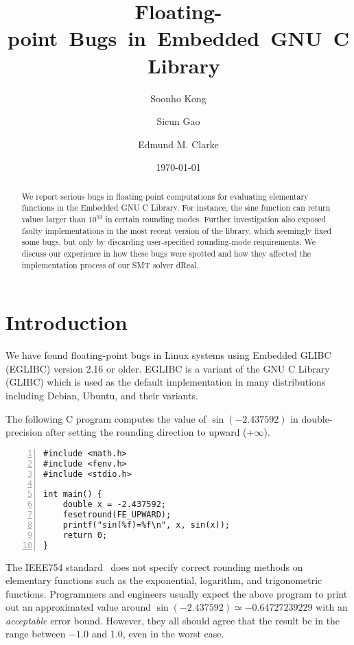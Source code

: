 \documentclass{llncs}
\title{\mbox{Floating-point Bugs in Embedded GNU C Library}}
\author{Soonho Kong \and Sicun Gao \and Edmund M. Clarke}
\institute{Carnegie Mellon University, Pittsburgh, PA 15213}
\date{\today}
\begin{document}
\maketitle

\begin{abstract}
We report serious bugs in floating-point computations for evaluating elementary
functions in the Embedded GNU C Library. For instance, the sine
function can return values larger than $10^{53}$ in certain rounding
modes. Further investigation also exposed faulty implementations in
the most recent version of the library, which seemingly fixed some
bugs, but only by discarding user-specified rounding-mode
requirements. We discuss our experience in how these bugs were
spotted and how they affected the implementation process of our
SMT solver dReal.
\end{abstract}

\section{Introduction}\label{sec:intro}




We have found floating-point bugs in Linux systems using Embedded
GLIBC (EGLIBC) version 2.16 or older. EGLIBC is a variant of the GNU C
Library (GLIBC) which is used as the default implementation in many
distributions including Debian, Ubuntu, and their variants.

The following C program computes the value of $\sin(-2.437592)$ in
double-precision after setting the rounding direction to upward
($+\infty$).

\begin{Verbatim}[numbers=left, frame=single, fontsize=\relsize{-1}]
#include <math.h>
#include <fenv.h>
#include <stdio.h>

int main() {
    double x = -2.437592;
    fesetround(FE_UPWARD);
    printf("sin(%f)=%f\n", x, sin(x));
    return 0;
}
\end{Verbatim}

The IEEE754 standard~\cite{IEEE:1985:AIS} does not specify correct
rounding methods on elementary functions such as the exponential,
logarithm, and trigonometric functions. Programmers and engineers
usually expect the above program to print out an approximated value
around $\sin(-2.437592) \simeq -0.64727239229$ with an \emph{acceptable}
error bound. However, they all should agree that the result be in
the range between $-1.0$ and $1.0$, even in the worst case.
\end{document}
